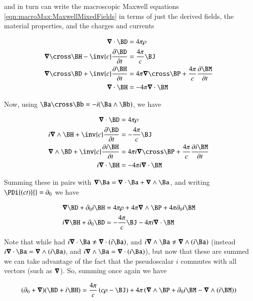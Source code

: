 and in turn can write the macroscopic Maxwell equations \ref{eqn:macroMax:MaxwellMixedFields}
in terms of just the derived fields, the material properties, and the charges and currents

\begin{align*}
\spacegrad \cdot \BD &= 4 \pi \rho \\
\spacegrad \cross \BH - \inv{c} \PD{t}{\BD} &= \frac{4 \pi}{c} \BJ \\
\spacegrad \cross \BD + \inv{c} \PD{t}{ \BH } &= 4 \pi \spacegrad \cross \BP + \frac{4\pi}{c} \PD{t}{ \BM }  \\
\spacegrad \cdot \BH &= - 4 \pi \spacegrad \cdot \BM \\
\end{align*}

Now, using $\Ba \cross \Bb = -i (\Ba \wedge \Bb)$, we have

\begin{align*}
\spacegrad \cdot \BD &= 4 \pi \rho \\
i \spacegrad \wedge \BH + \inv{c} \PD{t}{\BD} &= -\frac{4 \pi}{c} \BJ \\
\spacegrad \wedge \BD + \inv{c} \PD{t}{ i\BH } &= 4 \pi i \spacegrad \cross \BP + \frac{4\pi}{c} \PD{t}{ i \BM }  \\
i \spacegrad \cdot \BH &= - 4 \pi i \spacegrad \cdot \BM \\
\end{align*}

Summing these in pairs with $\spacegrad \Ba = \spacegrad \cdot \Ba + \spacegrad \wedge \Ba$, and writing $\PDi{(ct)}{} = \partial_0$ we have

\begin{align*}
\spacegrad \BD + \partial_0 {i\BH } &= 4 \pi \rho + 4 \pi \spacegrad \wedge \BP + {4\pi} \partial_0 { i \BM }  \\
i \spacegrad \BH + \partial_0 {\BD} &= -\frac{4 \pi}{c} \BJ - 4 \pi i \spacegrad \cdot \BM \\
\end{align*}

Note that while had $i\spacegrad \cdot \Ba \ne \spacegrad \cdot (i\Ba)$, and
$i\spacegrad \wedge \Ba \ne \spacegrad \wedge (i\Ba)$
(instead $i\spacegrad \cdot \Ba = \spacegrad \wedge (i\Ba)$, and
$i\spacegrad \wedge \Ba = \spacegrad \cdot (i\Ba)$), but now that these are summed we can take advantage of the fact that the pseudoscalar $i$
commutes with all vectors (such as $\boldsymbol{\nabla}$).  So, summing once again we have

\begin{align*}
(\partial_0 + \spacegrad)(\BD + i\BH ) &= 
\frac{4 \pi}{c} \left( c \rho - \BJ \right)
+ {4 \pi} \left( \spacegrad \wedge \BP + \partial_0 { i \BM }  - \spacegrad \wedge (i\BM) \right)
\\
\end{align*}


